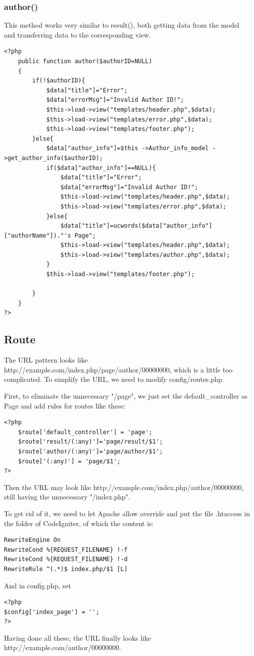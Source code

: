 \documentclass[a4paper]{article}
\begin{document}
            \subsubsection{author()}
This method works very similar to result(), both getting data from the model and transferring data to the corresponding view.
                \begin{verbatim}
<?php
    public function author($authorID=NULL)
    {
        if(!$authorID){
            $data["title"]="Error";
            $data["errorMsg"]="Invalid Author ID!";
            $this->load->view("templates/header.php",$data);
            $this->load->view("templates/error.php",$data);
            $this->load->view("templates/footer.php");
        }else{
            $data["author_info"]=$this ->Author_info_model ->get_author_info($authorID);
            if($data["author_info"]==NULL){
                $data["title"]="Error";
                $data["errorMsg"]="Invalid Author ID!";
                $this->load->view("templates/header.php",$data);
                $this->load->view("templates/error.php",$data);
            }else{
                $data["title"]=ucwords($data["author_info"]["authorName"])."'s Page";
                $this->load->view("templates/header.php",$data);
                $this->load->view("templates/author.php",$data);
            }
            $this->load->view("templates/footer.php");

        }
    }
?>
                \end{verbatim}
        \subsection{Route}
The URL pattern looks like http://example.com/index.php/page/author/00000000, which is a little too complicated. To simplify the URL, we need to modify config/routes.php.

First, to eliminate the unnecessary "/page", we just set the default\_controller as Page and add rules for routes like these:
            \begin{verbatim}
<?php
    $route['default_controller'] = 'page';
    $route['result/(:any)']='page/result/$1';
    $route['author/(:any)']='page/author/$1';
    $route['(:any)'] = 'page/$1';
?>
            \end{verbatim}
Then the URL may look like http://example.com/index.php/author/00000000, still having the unnecessary "/index.php".

To get rid of it, we need to let Apache allow override and put the file .htaccess in the folder of CodeIgniter, of which the content is:
            \begin{verbatim}
RewriteEngine On
RewriteCond %{REQUEST_FILENAME} !-f
RewriteCond %{REQUEST_FILENAME} !-d
RewriteRule ^(.*)$ index.php/$1 [L]
            \end{verbatim}
And in config.php, set
            \begin{verbatim}
<?php
$config['index_page'] = '';
?>
            \end{verbatim}
Having done all these, the URL finally looks like http://example.com/author/00000000.
\end{document}
